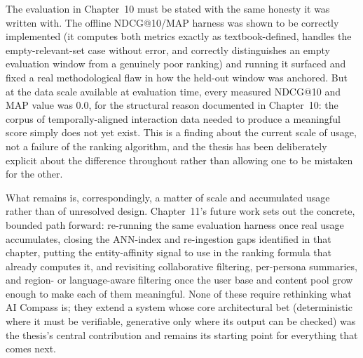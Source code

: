The evaluation in Chapter~10 must be stated with the same honesty it was written with. The offline NDCG@10/MAP harness was shown to be correctly implemented (it computes both metrics exactly as textbook-defined, handles the empty-relevant-set case without error, and correctly distinguishes an empty evaluation window from a genuinely poor ranking) and running it surfaced and fixed a real methodological flaw in how the held-out window was anchored. But at the data scale available at evaluation time, every measured NDCG@10 and MAP value was $0.0$, for the structural reason documented in Chapter~10: the corpus of temporally-aligned interaction data needed to produce a meaningful score simply does not yet exist. This is a finding about the current scale of usage, not a failure of the ranking algorithm, and the thesis has been deliberately explicit about the difference throughout rather than allowing one to be mistaken for the other.

What remains is, correspondingly, a matter of scale and accumulated usage rather than of unresolved design. Chapter~11's future work sets out the concrete, bounded path forward: re-running the same evaluation harness once real usage accumulates, closing the ANN-index and re-ingestion gaps identified in that chapter, putting the entity-affinity signal to use in the ranking formula that already computes it, and revisiting collaborative filtering, per-persona summaries, and region- or language-aware filtering once the user base and content pool grow enough to make each of them meaningful. None of these require rethinking what AI Compass is; they extend a system whose core architectural bet (deterministic where it must be verifiable, generative only where its output can be checked) was the thesis's central contribution and remains its starting point for everything that comes next.
